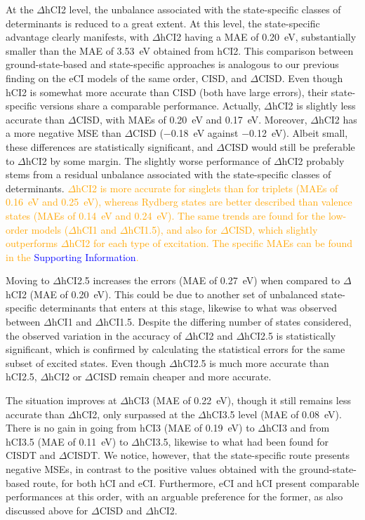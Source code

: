 \documentclass[aip,jcp,reprint,noshowkeys,superscriptaddress]{revtex4-1}
\newcommand{\fk}[1]{\textcolor{orange}{#1}}
\newcommand{\SupInf}{\textcolor{blue}{Supporting Information}}
\begin{document}
At the $\Delta$hCI2 level, the unbalance associated with the state-specific classes of determinants is reduced to a great extent.
At this level, the state-specific advantage clearly manifests, with $\Delta$hCI2 having a MAE of \SI{0.20}{\eV}, substantially smaller than the MAE of \SI{3.53}{\eV} obtained from hCI2.
This comparison between ground-state-based and state-specific approaches is analogous to our previous finding on the eCI models of the same order, CISD, and $\Delta$CISD. \cite{Kossoski_2023}
Even though hCI2 is somewhat more accurate than CISD (both have large errors), their state-specific versions share a comparable performance.
Actually, $\Delta$hCI2 is slightly less accurate than $\Delta$CISD, with MAEs of \SI{0.20}{\eV} and \SI{0.17}{\eV}.
Moreover, $\Delta$hCI2 has a more negative MSE than $\Delta$CISD (\SI{-0.18}{\eV} against \SI{-0.12}{\eV}).
Albeit small, these differences are statistically significant, and $\Delta$CISD would still be preferable to $\Delta$hCI2 by some margin.
The slightly worse performance of $\Delta$hCI2 probably stems from a residual unbalance associated with the state-specific classes of determinants.
\fk{$\Delta$hCI2 is more accurate for singlets than for triplets (MAEs of \SI{0.16}{\eV} and \SI{0.25}{\eV}),
whereas Rydberg states are better described than valence states (MAEs of \SI{0.14}{\eV} and \SI{0.24}{\eV}).
The same trends are found for the low-order models ($\Delta$hCI1 and $\Delta$hCI1.5), and also for $\Delta$CISD, which slightly outperforms $\Delta$hCI2 for each type of excitation.
The specific MAEs can be found in the {\SupInf}.}

Moving to $\Delta$hCI2.5 increases the errors (MAE of \SI{0.27}{\eV}) when compared to $\Delta$hCI2 (MAE of \SI{0.20}{\eV}).
This could be due to another set of unbalanced state-specific determinants that enters at this stage, likewise to what was observed between $\Delta$hCI1 and $\Delta$hCI1.5.
Despite the differing number of states considered, the observed variation in the accuracy of $\Delta$hCI2 and $\Delta$hCI2.5 is statistically significant,
which is confirmed by calculating the statistical errors for the same subset of excited states.
Even though $\Delta$hCI2.5 is much more accurate than hCI2.5, $\Delta$hCI2 or $\Delta$CISD remain cheaper and more accurate.

The situation improves at $\Delta$hCI3 (MAE of \SI{0.22}{\eV}), though it still remains less accurate than $\Delta$hCI2,
only surpassed at the $\Delta$hCI3.5 level (MAE of \SI{0.08}{\eV}).
There is no gain in going from hCI3 (MAE of \SI{0.19}{\eV}) to $\Delta$hCI3 and from hCI3.5 (MAE of \SI{0.11}{\eV}) to $\Delta$hCI3.5,
likewise to what had been found for CISDT and $\Delta$CISDT. \cite{Kossoski_2023}
We notice, however, that the state-specific route presents negative MSEs, in contrast to the positive values obtained with the ground-state-based route, for both hCI and eCI.
Furthermore, eCI and hCI present comparable performances at this order, with an arguable preference for the former,
as also discussed above for $\Delta$CISD and $\Delta$hCI2.
\end{document}

